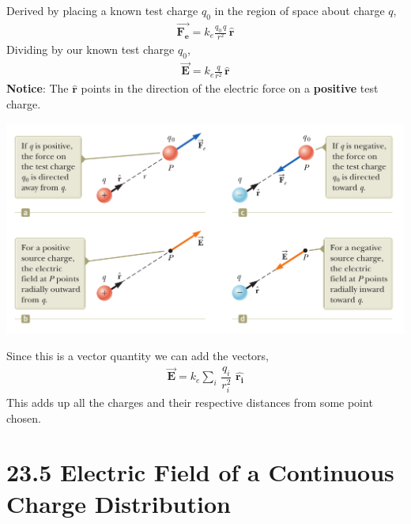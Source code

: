 \documentclass[12pt, titlepage, oneside]{article}
\let\oldhat\hat
\let\oldvec\vec
\renewcommand{\hat}[1]{\oldhat{\mathbf{#1}}}
\renewcommand{\vec}[1]{\oldvec{\bm{#1}}}
\renewcommand{\hat}[1]{\oldhat{\bm{#1}}}
\begin{document}
	Derived by placing a known test charge $q_0$ in the region of space about charge $q$,
	\begin{align*}
	\vec{F_e} = k_e \frac{q_0\,q}{r^2}\, \hat{r} 
	\end{align*}
	Dividing by our known test charge $q_0$,
	\begin{align*}
	\vec{E} = k_e \frac{q}{r^2}\, \hat{r} 
	\end{align*}
	\textbf{Notice}: The $\hat{r}$ points in the direction of the electric force on a \textbf{positive} test charge. 
	\begin{center}
	\includegraphics[scale=0.34]{1.png}
	\end{center}
	Since this is a vector quantity we can add the vectors,
	\begin{align*}
	\vec{E} = k_e \sum_i \,\dfrac{q_i}{r_i^2}\,\,\hat{r_i}
	\end{align*}
	This adds up all the charges and their respective distances from some point chosen.
	\section*{23.5 Electric Field of a Continuous Charge Distribution}
	\noindent{}
	\vspace{1mm}
	
\end{document}
